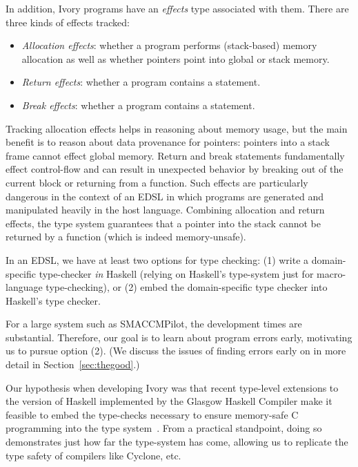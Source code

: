 In addition, Ivory programs have an \emph{effects} type associated with them.
There are three kinds of effects tracked:
\begin{itemize}
  \item \emph{Allocation effects}: whether a program performs (stack-based)
    memory allocation as well as whether pointers point into global or stack memory.
  \item \emph{Return effects}: whether a program contains a  statement.
  \item \emph{Break effects}: whether a program contains a 
    statement.
\end{itemize}
\noindent
Tracking allocation effects helps in reasoning about memory usage, but the main
benefit is to reason about data provenance for pointers: pointers into a stack
frame cannot effect global memory.  Return and break statements fundamentally
effect control-flow and can result in unexpected behavior by breaking out of the
current block or returning from a function.  Such effects are particularly
dangerous in the context of an EDSL in which programs are generated and
manipulated heavily in the host language.  Combining allocation and return
effects, the type system guarantees that a pointer into the stack cannot be
returned by a function (which is indeed memory-unsafe).

In an EDSL, we have at least two options for type checking: (1) write a
domain-specific type-checker \emph{in} Haskell (relying on Haskell's type-system
just for macro-language type-checking), or (2) embed the domain-specific type
checker into Haskell's type checker.

For a large system such as SMACCMPilot, the development times are substantial.
Therefore, our goal is to learn about program errors early, motivating us to
pursue option (2).  (We discuss the issues of finding errors early on in more detail in
Section~\ref{sec:thegood}.)

Our hypothesis when developing Ivory was that recent type-level extensions to the
version of Haskell implemented by the Glasgow Haskell Compiler make it feasible
to embed the type-checks necessary to ensure memory-safe C programming into the
type system~\cite{dephaskell}.  From a practical standpoint, doing so
demonstrates just how far the type-system has come, allowing us to replicate the
type safety of compilers like Cyclone, etc.

